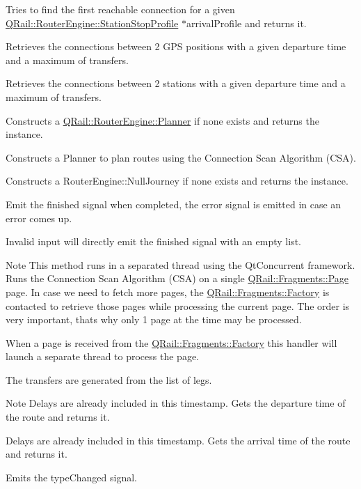 Tries to find the first reachable connection for a given \mbox{\hyperlink{classQRail_1_1RouterEngine_1_1StationStopProfile}{Q\+Rail\+::\+Router\+Engine\+::\+Station\+Stop\+Profile}} $\ast$arrival\+Profile and returns it.

Retrieves the connections between 2 G\+PS positions with a given departure time and a maximum of transfers.

Retrieves the connections between 2 stations with a given departure time and a maximum of transfers.

Constructs a \mbox{\hyperlink{classQRail_1_1RouterEngine_1_1Planner}{Q\+Rail\+::\+Router\+Engine\+::\+Planner}} if none exists and returns the instance.

Constructs a Planner to plan routes using the Connection Scan Algorithm (C\+SA).

Constructs a Router\+Engine\+::\+Null\+Journey if none exists and returns the instance.

Emit the finished signal when completed, the error signal is emitted in case an error comes up.

Invalid input will directly emit the finished signal with an empty list.

\begin{DoxyNote}{Note}
This method runs in a separated thread using the Qt\+Concurrent framework. Runs the Connection Scan Algorithm (C\+SA) on a single \mbox{\hyperlink{classQRail_1_1Fragments_1_1Page}{Q\+Rail\+::\+Fragments\+::\+Page}} page. In case we need to fetch more pages, the \mbox{\hyperlink{classQRail_1_1Fragments_1_1Factory}{Q\+Rail\+::\+Fragments\+::\+Factory}} is contacted to retrieve those pages while processing the current page. The order is very important, that\textquotesingle{}s why only 1 page at the time may be processed.
\end{DoxyNote}
When a page is received from the \mbox{\hyperlink{classQRail_1_1Fragments_1_1Factory}{Q\+Rail\+::\+Fragments\+::\+Factory}} this handler will launch a separate thread to process the page.

The transfers are generated from the list of legs.

\begin{DoxyNote}{Note}
Delays are already included in this timestamp. Gets the departure time of the route and returns it.

Delays are already included in this timestamp. Gets the arrival time of the route and returns it.
\end{DoxyNote}
Emits the type\+Changed signal.

